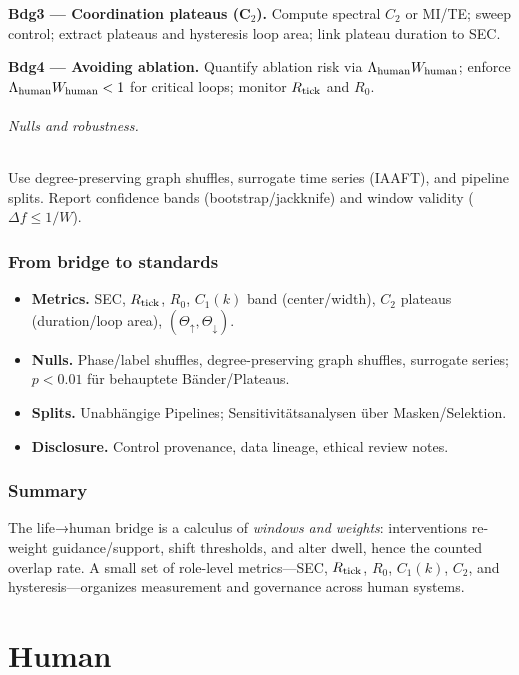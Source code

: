 \documentclass[12pt,a4paper,oneside]{scrreprt}
\begin{document}
\textbf{Bdg3 — Coordination plateaus (C$_2$).}
Compute spectral $C_2$ or MI/TE; sweep control; extract plateaus and hysteresis loop area; link plateau duration to SEC.

\textbf{Bdg4 — Avoiding ablation.}
Quantify ablation risk via $\Lambda_{\rm human} W_{\rm human}$; enforce 
\(
\Lambda_{\rm human} W_{\rm human}<1
\)
for critical loops; monitor $R_{\rm tick}$ and $R_0$.

\paragraph{Nulls and robustness.}
Use degree-preserving graph shuffles, surrogate time series (IAAFT), and pipeline splits. Report confidence bands (bootstrap/jackknife) and window validity ($\Delta f\le 1/W$).

\section{From bridge to standards}\label{sec:bridge-standards}
\begin{itemize}
\item \textbf{Metrics.} SEC, $R_{\rm tick}$, $R_0$, $C_1(k)$ band (center/width), $C_2$ plateaus (duration/loop area), $(\Theta_\uparrow,\Theta_\downarrow)$.
\item \textbf{Nulls.} Phase/label shuffles, degree-preserving graph shuffles, surrogate series; $p<0.01$ für behauptete Bänder/Plateaus.
\item \textbf{Splits.} Unabhängige Pipelines; Sensitivitätsanalysen über Masken/Selektion.
\item \textbf{Disclosure.} Control provenance, data lineage, ethical review notes.
\end{itemize}

\section*{Summary}
The life→human bridge is a calculus of \emph{windows and weights}: interventions re-weight guidance/support, shift thresholds, and alter dwell, hence the counted overlap rate. 
A small set of role-level metrics—SEC, $R_{\rm tick}$, $R_0$, $C_1(k)$, $C_2$, and hysteresis—organizes measurement and governance across human systems.

\part{Human}
\end{document}
